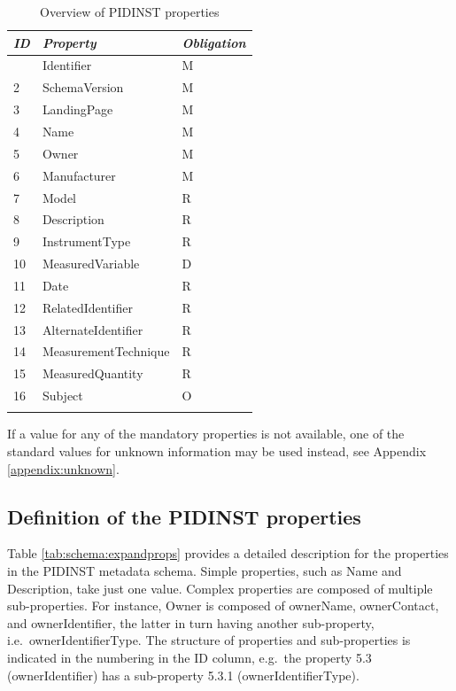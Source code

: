 \documentclass[titlepage=true,twoside=false,DIV=13]{scrartcl}
\begin{document}
\enlargethispage{\baselineskip}
\begin{longtable}{|l|l|l|}
  \hline
  \emph{ID} & \emph{Property} & \emph{Obligation} \\
  \hline \endhead
  \hline \endfoot\endlastfoot
  1     & Identifier           & M \\
  2     & SchemaVersion        & M \\
  3     & LandingPage          & M \\
  4     & Name                 & M \\
  5     & Owner                & M \\
  6     & Manufacturer         & M \\
  7     & Model                & R \\
  8     & Description          & R \\
  9     & InstrumentType       & R \\
  10    & MeasuredVariable     & D \\
  11    & Date                 & R \\
  12    & RelatedIdentifier    & R \\
  13    & AlternateIdentifier  & R \\
  14    & MeasurementTechnique & R \\
  15    & MeasuredQuantity     & R \\
  16    & Subject              & O \\
  \hline
  \caption{Overview of PIDINST properties}
  \label{tab:schema:propoverview}
\end{longtable}

If a value for any of the mandatory properties is not available, one
of the standard values for unknown information may be used instead,
see Appendix \ref{appendix:unknown}.

\subsection{Definition of the PIDINST properties}

Table \ref{tab:schema:expandprops} provides a detailed description for
the properties in the PIDINST metadata schema.  Simple properties,
such as Name and Description, take just one value.  Complex properties
are composed of multiple sub-properties.  For instance, Owner is
composed of ownerName, ownerContact, and ownerIdentifier, the latter
in turn having another sub-property, i.e.\ ownerIdentifierType.  The
structure of properties and sub-properties is indicated in the
numbering in the ID column, e.g.\ the property 5.3 (ownerIdentifier)
has a sub-property 5.3.1 (ownerIdentifierType).
\end{document}
